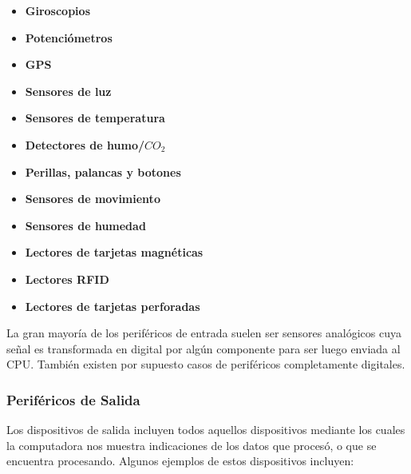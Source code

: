 \begin{minipage}{0.45\textwidth}
    \begin{itemize}
        \item \textbf{Giroscopios}
        \item \textbf{Potenciómetros}
        \item \textbf{GPS}
        \item \textbf{Sensores de luz}
        \item \textbf{Sensores de temperatura}
        \item \textbf{Detectores de humo/$CO_2$}
    \end{itemize}
\end{minipage}
\begin{minipage}{0.45\textwidth}
    \begin{itemize}
        \item \textbf{Perillas, palancas y botones}
        \item \textbf{Sensores de movimiento}
        \item \textbf{Sensores de humedad}
        \item \textbf{Lectores de tarjetas magnéticas}
        \item \textbf{Lectores RFID}
        \item \textbf{Lectores de tarjetas perforadas}
    \end{itemize}
\end{minipage}

La gran mayoría de los periféricos de entrada suelen ser sensores analógicos
cuya señal es transformada en digital por algún componente para ser luego
enviada al CPU. También existen por supuesto casos de periféricos completamente
digitales.

\subsubsection*{Periféricos de Salida}

Los dispositivos de salida incluyen todos aquellos dispositivos mediante los
cuales la computadora nos muestra indicaciones de los datos que procesó, o
que se encuentra procesando.\autocite[p. 352]{laplante_2000} Algunos ejemplos
de estos dispositivos incluyen:

